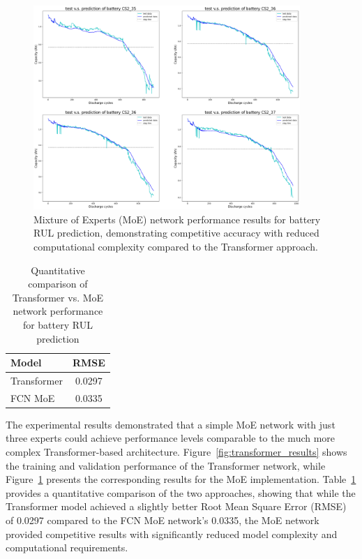 \begin{figure}[htbp]
    \centering
    \includegraphics[width=0.9\textwidth]{imgs/moe_graph_results.png}
    \caption{Mixture of Experts (MoE) network performance results for battery RUL prediction, demonstrating competitive accuracy with reduced computational complexity compared to the Transformer approach.}
    \label{fig:moe_results}
\end{figure}

\begin{table}[htbp]
    \centering
    \caption{Quantitative comparison of Transformer vs. MoE network performance for battery RUL prediction}
    \label{tab:transformer_moe_results}
    \begin{tabular}{lc}
        \hline
        \textbf{Model} & \textbf{RMSE} \\
        \hline
        Transformer & 0.0297 \\
        FCN MoE & 0.0335 \\
        \hline
    \end{tabular}
\end{table}

The experimental results demonstrated that a simple MoE network with just three experts could achieve performance levels comparable to the much more complex Transformer-based architecture. Figure~\ref{fig:transformer_results} shows the training and validation performance of the Transformer network, while Figure~\ref{fig:moe_results} presents the corresponding results for the MoE implementation. Table~\ref{tab:transformer_moe_results} provides a quantitative comparison of the two approaches, showing that while the Transformer model achieved a slightly better Root Mean Square Error (RMSE) of 0.0297 compared to the FCN MoE network's 0.0335, the MoE network provided competitive results with significantly reduced model complexity and computational requirements.

